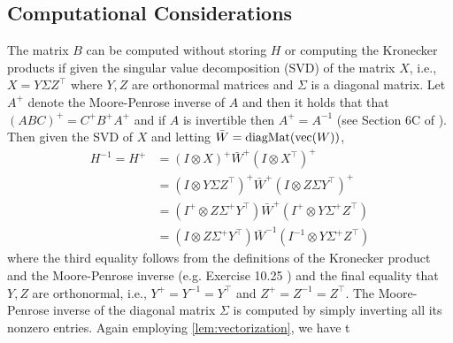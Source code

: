 \subsection{Computational Considerations}
The matrix $B$ can be computed without storing $H$ or computing the Kronecker products if given the singular value decomposition (SVD) of the matrix $X$, i.e., $X = Y\Sigma Z^\top$ where $Y,Z$ are orthonormal matrices and $\Sigma$ is a diagonal matrix. Let $A^+$ denote the Moore-Penrose inverse of $A$ and then it holds that that $(ABC)^+ = C^+B^+A^+$ and if $A$ is invertible then $A^+ = A^{-1}$ (see Section 6C of \citet{axler}). Then given the SVD of $X$ and letting $\bar W = \operatorname{diagMat}(\operatorname{vec}(W))$, 
\begin{align*}
    H^{-1}=H^{+} &= (I\otimes X)^+ \bar W^+ (I\otimes X^\top)^+ \\
    &= (I\otimes Y\Sigma Z^\top)^+ \bar W^+ (I\otimes Z\Sigma Y^\top)^+ \\
    &= (I^+\otimes Z\Sigma^+ Y^\top) \bar W^+ (I^+\otimes Y\Sigma^+ Z^\top) \\
    &= (I\otimes Z\Sigma^+ Y^\top) \bar W^{-1} (I^{-1}\otimes Y\Sigma^+ Z^\top)
\end{align*}
where the third equality follows from the definitions of the Kronecker product and the Moore-Penrose inverse (e.g. Exercise 10.25 \citet{Abadir_Magnus_2005}) and the final equality that $Y,Z$ are orthonormal, i.e., $Y^+ = Y^{-1} = Y^\top$ and $Z^+ = Z^{-1}=Z^\top$. The Moore-Penrose inverse of the diagonal matrix $\Sigma$ is computed by simply inverting all its nonzero entries. Again employing \cref{lem:vectorization}, we have t

